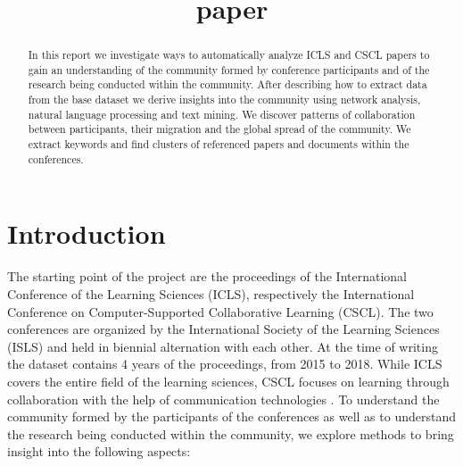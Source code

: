 \documentclass[article,twocolumn]{IEEEtran}
\title{paper}
\begin{document}
    
    
    
\renewcommand{\figurename}{Figure}
\captionsetup{labelformat=simple}\title{   }
\author{
}
\maketitle

    
    

    

\begin{abstract}
    In this report we investigate ways to automatically analyze ICLS and
CSCL papers to gain an understanding of the community formed by
conference participants and of the research being conducted within the
community. After describing how to extract data from the base dataset we
derive insights into the community using network analysis, natural
language processing and text mining. We discover patterns of
collaboration between participants, their migration and the global
spread of the community. We extract keywords and find clusters of
referenced papers and documents within the conferences.
\end{abstract}
    \hypertarget{introduction}{%
\section{Introduction}\label{introduction}}

The starting point of the project are the proceedings of the
International Conference of the Learning Sciences (ICLS), respectively
the International Conference on Computer-Supported Collaborative
Learning (CSCL). The two conferences are organized by the International
Society of the Learning Sciences (ISLS) and held in biennial alternation
with each other. At the time of writing the dataset contains 4 years of
the proceedings, from 2015 to 2018. While ICLS covers the entire field
of the learning sciences, CSCL focuses on learning through collaboration
with the help of communication technologies \cite{ICLS}. To understand
the community formed by the participants of the conferences as well as
to understand the research being conducted within the community, we
explore methods to bring insight into the following aspects:
\end{document}
